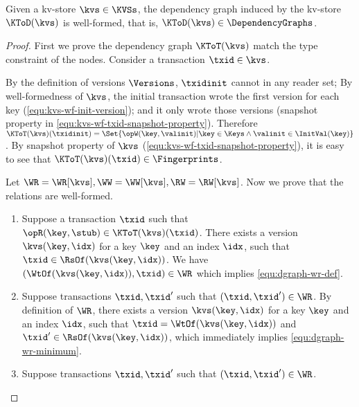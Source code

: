 \begin{toappendix}
\label{sec:proof-kv-to-dep-graph}
\begin{proposition}
\label{prop:ktod-well-defined}
Given a kv-store \( \kvs \in \KVSs \), 
the dependency graph induced by the kv-store \( \KToD(\kvs) \) is well-formed,
that is, \( \KToD(\kvs) \in \DependencyGraphs\).
\end{proposition}
\begin{proof}
First we prove the dependency graph \( \KToT(\kvs) \) match the type constraint of the nodes.
Consider a transaction \( \txid \in \kvs \).
\begin{enumerate}
\Case{\( \txid = \txidinit \)}
    By the definition of versions \( \Versions \), \( \txidinit \) cannot in any reader set;
    By well-formedness of \( \kvs \), the initial transaction wrote the first version for each key (\cref{equ:kvs-wf-init-version});
    and it only wrote those versions (snapshot property in \cref{equ:kvs-wf-txid-snapshot-property}).
    Therefore \( \KToT(\kvs)(\txidinit) = \Set{\opW(\key,\valinit) | \key \in \Keys \land \valinit \in \InitVal(\key) } \).
\Case{\( \txid \neq \txidinit \)}
    By snapshot property of \( \kvs \) (\cref{equ:kvs-wf-txid-snapshot-property}), 
    it is easy to see that \( \KToT(\kvs)(\txid) \in \Fingerprints\).
\end{enumerate}
Let \( \WR = \WR[\kvs], \WW = \WW[\kvs] , \RW= \RW[\kvs]\).
Now we prove that the relations are well-formed.
\begin{enumerate}
    \begin{enumerate}
    \item Suppose a transaction \( \txid \) such that \( \opR(\key,\stub) \in \KToT(\kvs)(\txid) \).
        There exists a version \( \kvs(\key,\idx) \) for a key \( \key \) and an index \( \idx \), 
        such that \( \txid \in \RsOf(\kvs(\key,\idx))\).
        We have \( (\WtOf(\kvs(\key,\idx)),\txid) \in \WR \) which implies \cref{equ:dgraph-wr-def}.
    \item Suppose transactions \( \txid, \txid'\) such that \( (\txid, \txid') \in \WR \).
        By definition of \( \WR \), there exists a version \( \kvs(\key,\idx) \) 
        for a key \( \key \) and an index \( \idx \), such that \( \txid = \WtOf(\kvs(\key,\idx))\)
        and \( \txid' \in \RsOf(\kvs(\key,\idx))\), which immediately implies \cref{equ:dgraph-wr-minimum}.
    \item Suppose transactions \( \txid, \txid'\) such that \( (\txid, \txid') \in \WR \).

\end{enumerate}
\end{enumerate}
\end{proof}
\end{toappendix}
